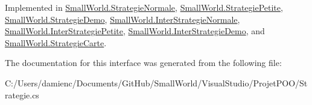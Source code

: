 Implemented in \hyperlink{class_small_world_1_1_strategie_normale_a8b9231f4b96f063008eeb670f8f09db6}{Small\-World.\-Strategie\-Normale}, \hyperlink{class_small_world_1_1_strategie_petite_a19e5824d046b8dc0e982465195458192}{Small\-World.\-Strategie\-Petite}, \hyperlink{class_small_world_1_1_strategie_demo_afc2d6c69d19a33fa894c3193d7244200}{Small\-World.\-Strategie\-Demo}, \hyperlink{interface_small_world_1_1_inter_strategie_normale_aace3ff2e35a5d3aa0aacf936fbef90cd}{Small\-World.\-Inter\-Strategie\-Normale}, \hyperlink{interface_small_world_1_1_inter_strategie_petite_a0f21705a853b281aec9140107d1e37d4}{Small\-World.\-Inter\-Strategie\-Petite}, \hyperlink{interface_small_world_1_1_inter_strategie_demo_a302a516e2be5370c90ecd6e73b100f73}{Small\-World.\-Inter\-Strategie\-Demo}, and \hyperlink{class_small_world_1_1_strategie_carte_a705ec27550d4dd65ec9295a851580c63}{Small\-World.\-Strategie\-Carte}.



The documentation for this interface was generated from the following file\-:\begin{DoxyCompactItemize}
\item 
C\-:/\-Users/damienc/\-Documents/\-Git\-Hub/\-Small\-World/\-Visual\-Studio/\-Projet\-P\-O\-O/Strategie.\-cs\end{DoxyCompactItemize}
